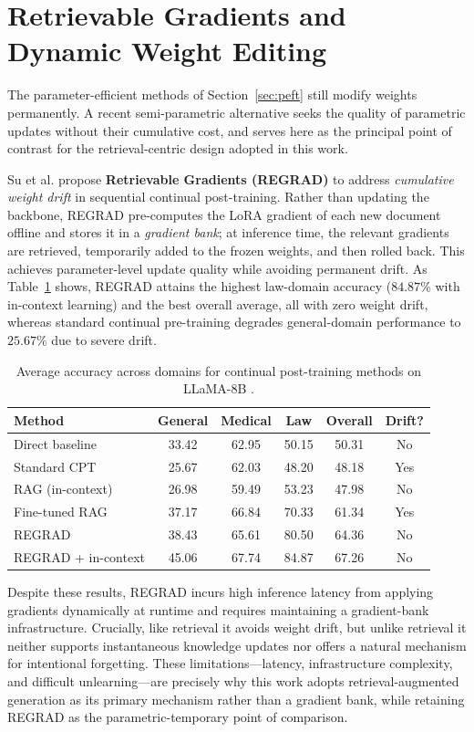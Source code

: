 \section{Retrievable Gradients and Dynamic Weight Editing}
\label{sec:regrad}

The parameter-efficient methods of Section~\ref{sec:peft} still modify weights permanently. A recent semi-parametric alternative seeks the quality of parametric updates without their cumulative cost, and serves here as the principal point of contrast for the retrieval-centric design adopted in this work.

Su et al. \parencite{su2026retrievablegradientscontinualposttraining} propose \textbf{Retrievable Gradients (REGRAD)} to address \emph{cumulative weight drift} in sequential continual post-training. Rather than updating the backbone, REGRAD pre-computes the LoRA gradient of each new document offline and stores it in a \emph{gradient bank}; at inference time, the relevant gradients are retrieved, temporarily added to the frozen weights, and then rolled back. This achieves parameter-level update quality while avoiding permanent drift. As Table~\ref{tab:regrad} shows, REGRAD attains the highest law-domain accuracy ($84.87\%$ with in-context learning) and the best overall average, all with zero weight drift, whereas standard continual pre-training degrades general-domain performance to $25.67\%$ due to severe drift.

\begin{table}[H]
\centering
\small
\caption{Average accuracy across domains for continual post-training methods on LLaMA-8B \parencite{su2026retrievablegradientscontinualposttraining}.}
\label{tab:regrad}
\begin{tabularx}{\textwidth}{X c c c c c}
\hline
\textbf{Method} & \textbf{General} & \textbf{Medical} & \textbf{Law} & \textbf{Overall} & \textbf{Drift?} \\
\hline
Direct baseline & 33.42 & 62.95 & 50.15 & 50.31 & No \\
Standard CPT & 25.67 & 62.03 & 48.20 & 48.18 & Yes \\
RAG (in-context) & 26.98 & 59.49 & 53.23 & 47.98 & No \\
Fine-tuned RAG & 37.17 & 66.84 & 70.33 & 61.34 & Yes \\
REGRAD & 38.43 & 65.61 & 80.50 & 64.36 & No \\
REGRAD + in-context & 45.06 & 67.74 & 84.87 & 67.26 & No \\
\hline
\end{tabularx}
\end{table}

Despite these results, REGRAD incurs high inference latency from applying gradients dynamically at runtime and requires maintaining a gradient-bank infrastructure. Crucially, like retrieval it avoids weight drift, but unlike retrieval it neither supports instantaneous knowledge updates nor offers a natural mechanism for intentional forgetting. These limitations---latency, infrastructure complexity, and difficult unlearning---are precisely why this work adopts retrieval-augmented generation as its primary mechanism rather than a gradient bank, while retaining REGRAD as the parametric-temporary point of comparison.
